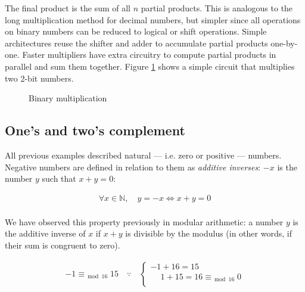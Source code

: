 The final product is the sum of all $n$ partial products.  This is analogous to
the long multiplication method for decimal numbers, but simpler since all
operations on binary numbers can be reduced to logical or shift operations.
Simple architectures reuse the shifter and adder to accumulate partial products
one-by-one.  Faster multipliers have extra circuitry to compute partial products
in parallel and sum them together.  Figure \ref{fig:arch:mul} shows a simple
circuit that multiplies two 2-bit numbers.

\begin{figure}[ht]
    \centering
    \hspace{2em}
    \begin{subfigure}[h]{0.65\textwidth}
        
    \end{subfigure}
    \caption{Binary multiplication}
    \label{fig:arch:mul}
\end{figure}

\subsection{One's and two's complement}

\label{subsec:arch:ones_twos_comp}

All previous examples described natural --- i.e. zero or positive --- numbers.
Negative numbers are defined in relation to them as \textit{additive inverses}:
$-x$ is the number $y$ such that $x + y = 0$:

\begin{align*}
    \forall x \in \mathbb{N}, \quad y = -x \iff x + y = 0 \\
\end{align*}

We have observed this property previously in modular arithmetic: a number $y$ is
the additive inverse of $x$ if $x + y$ is divisible by the modulus (in other
words, if their sum is congruent to zero)\footnotemark.


\begin{align*}
    -1 \equiv_{\bmod{16}} 15
    \quad \because \quad
    \begin{cases}
                 - 1 + 16 = 15 \\
        \phantom{-}1 + 15 = 16 \equiv_{\bmod{16}} 0 \\
    \end{cases} \\
\end{align*}

